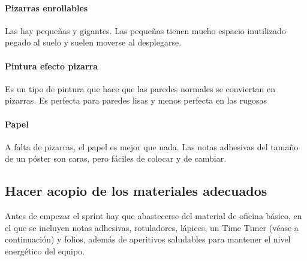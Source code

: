 \documentclass[10pt]{article}
\begin{document}
\begin{multicols}{2}
\paragraph*{Pizarras enrollables}
Las hay pequeñas y gigantes. Las pequeñas tienen mucho espacio inutilizado pegado al suelo y suelen moverse al desplegarse.
\paragraph*{Pintura efecto pizarra}
Es un tipo de pintura que hace que las paredes normales se conviertan en pizarras. Es perfecta para paredes lisas y menos perfecta en las rugosas
\paragraph*{Papel}
A falta de pizarras, el papel es mejor que nada. Las notas adhesivas del tamaño de un póster son caras, pero fáciles de colocar y de cambiar.
\subsection*{Hacer acopio de los materiales adecuados}
Antes de empezar el sprint hay que abastecerse del material de oficina básico, en el que se incluyen notas adhesivas, rotuladores, lápices, un Time Timer (véase a continuación) y folios, además de aperitivos saludables para mantener el nivel energético del equipo.
\end{multicols}
\end{document}
